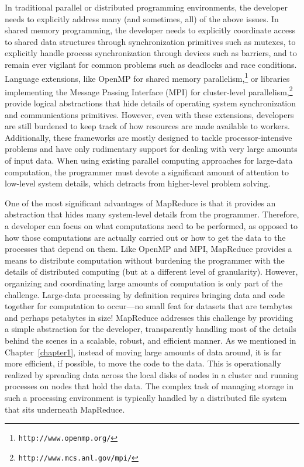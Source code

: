 In traditional parallel or distributed programming environments, the
developer needs to explicitly address many (and sometimes, all) of the
above issues.  In shared memory programming, the developer needs to
explicitly coordinate access to shared data structures through
synchronization primitives such as mutexes, to explicitly handle
process synchronization through devices such as barriers, and to
remain ever vigilant for common problems such as deadlocks and race
conditions.  Language extensions, like OpenMP for shared memory
parallelism,\footnote{\texttt{http://www.openmp.org/}} or libraries
implementing the Message Passing Interface (MPI) for cluster-level
parallelism,\footnote{\texttt{http://www.mcs.anl.gov/mpi/}} provide logical
abstractions that hide details of operating system synchronization and
communications primitives.  However, even with these extensions,
developers are still burdened to keep track of how resources are made
available to workers.  Additionally, these frameworks are mostly
designed to tackle processor-intensive problems and have only
rudimentary support for dealing with very large amounts of input data.
When using existing parallel computing approaches for large-data
computation, the programmer must devote a significant amount of
attention to low-level system details, which detracts from
higher-level problem solving.

One of the most significant advantages of MapReduce is that it
provides an abstraction that hides many system-level details from the
programmer.  Therefore, a developer can focus on what computations
need to be performed, as opposed to how those computations are
actually carried out or how to get the data to the processes that
depend on them.  Like OpenMP and MPI, MapReduce provides a means to
distribute computation without burdening the programmer with the
details of distributed computing (but at a different level of
granularity).  However, organizing and coordinating large amounts of
computation is only part of the challenge.  Large-data processing by
definition requires bringing data and code together for computation to
occur---no small feat for datasets that are terabytes and perhaps
petabytes in size!  MapReduce addresses this challenge by providing a
simple abstraction for the developer, transparently handling most of
the details behind the scenes in a scalable, robust, and efficient
manner.  As we mentioned in Chapter~\ref{chapter1}, instead of moving
large amounts of data around, it is far more efficient, if possible,
to move the code to the data.  This is operationally realized by
spreading data across the local disks of nodes in a cluster and
running processes on nodes that hold the data.  The complex task of
managing storage in such a processing environment is typically handled
by a distributed file system that sits underneath MapReduce.

